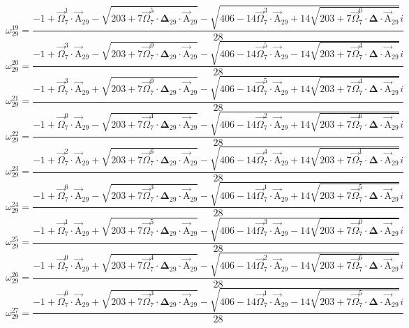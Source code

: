 \documentclass{article}
\begin{document}
\[ \omega_{29}^{19}=\frac{-1+\vec{\Omega}_{7}^{1}\cdot\vec{\mathrm{A}}_{29}-\sqrt{203+7\vec{\Omega}_{7}^{5}\cdot\boldsymbol{\Delta}_{29}\cdot\vec{\mathrm{A}}_{29}}-\sqrt{406-14\vec{\Omega}_{7}^{3}\cdot\vec{\mathrm{A}}_{29}+14\sqrt{203+7\vec{\Omega}_{7}^{0}\cdot\boldsymbol{\Delta}\cdot\vec{\mathrm{A}}_{29}}}i}{28} \]
\[ \omega_{29}^{20}=\frac{-1+\vec{\Omega}_{7}^{3}\cdot\vec{\mathrm{A}}_{29}-\sqrt{203+7\vec{\Omega}_{7}^{0}\cdot\boldsymbol{\Delta}_{29}\cdot\vec{\mathrm{A}}_{29}}-\sqrt{406-14\vec{\Omega}_{7}^{5}\cdot\vec{\mathrm{A}}_{29}-14\sqrt{203+7\vec{\Omega}_{7}^{4}\cdot\boldsymbol{\Delta}\cdot\vec{\mathrm{A}}_{29}}}i}{28} \]
\[ \omega_{29}^{21}=\frac{-1+\vec{\Omega}_{7}^{3}\cdot\vec{\mathrm{A}}_{29}+\sqrt{203+7\vec{\Omega}_{7}^{0}\cdot\boldsymbol{\Delta}_{29}\cdot\vec{\mathrm{A}}_{29}}-\sqrt{406-14\vec{\Omega}_{7}^{5}\cdot\vec{\mathrm{A}}_{29}+14\sqrt{203+7\vec{\Omega}_{7}^{4}\cdot\boldsymbol{\Delta}\cdot\vec{\mathrm{A}}_{29}}}i}{28} \]
\[ \omega_{29}^{22}=\frac{-1+\vec{\Omega}_{7}^{0}\cdot\vec{\mathrm{A}}_{29}-\sqrt{203+7\vec{\Omega}_{7}^{4}\cdot\boldsymbol{\Delta}_{29}\cdot\vec{\mathrm{A}}_{29}}-\sqrt{406-14\vec{\Omega}_{7}^{2}\cdot\vec{\mathrm{A}}_{29}+14\sqrt{203+7\vec{\Omega}_{7}^{6}\cdot\boldsymbol{\Delta}\cdot\vec{\mathrm{A}}_{29}}}i}{28} \]
\[ \omega_{29}^{23}=\frac{-1+\vec{\Omega}_{7}^{2}\cdot\vec{\mathrm{A}}_{29}+\sqrt{203+7\vec{\Omega}_{7}^{6}\cdot\boldsymbol{\Delta}_{29}\cdot\vec{\mathrm{A}}_{29}}-\sqrt{406-14\vec{\Omega}_{7}^{4}\cdot\vec{\mathrm{A}}_{29}+14\sqrt{203+7\vec{\Omega}_{7}^{1}\cdot\boldsymbol{\Delta}\cdot\vec{\mathrm{A}}_{29}}}i}{28} \]
\[ \omega_{29}^{24}=\frac{-1+\vec{\Omega}_{7}^{6}\cdot\vec{\mathrm{A}}_{29}-\sqrt{203+7\vec{\Omega}_{7}^{3}\cdot\boldsymbol{\Delta}_{29}\cdot\vec{\mathrm{A}}_{29}}-\sqrt{406-14\vec{\Omega}_{7}^{1}\cdot\vec{\mathrm{A}}_{29}+14\sqrt{203+7\vec{\Omega}_{7}^{5}\cdot\boldsymbol{\Delta}\cdot\vec{\mathrm{A}}_{29}}}i}{28} \]
\[ \omega_{29}^{25}=\frac{-1+\vec{\Omega}_{7}^{1}\cdot\vec{\mathrm{A}}_{29}+\sqrt{203+7\vec{\Omega}_{7}^{5}\cdot\boldsymbol{\Delta}_{29}\cdot\vec{\mathrm{A}}_{29}}-\sqrt{406-14\vec{\Omega}_{7}^{3}\cdot\vec{\mathrm{A}}_{29}-14\sqrt{203+7\vec{\Omega}_{7}^{0}\cdot\boldsymbol{\Delta}\cdot\vec{\mathrm{A}}_{29}}}i}{28} \]
\[ \omega_{29}^{26}=\frac{-1+\vec{\Omega}_{7}^{0}\cdot\vec{\mathrm{A}}_{29}+\sqrt{203+7\vec{\Omega}_{7}^{4}\cdot\boldsymbol{\Delta}_{29}\cdot\vec{\mathrm{A}}_{29}}-\sqrt{406-14\vec{\Omega}_{7}^{2}\cdot\vec{\mathrm{A}}_{29}-14\sqrt{203+7\vec{\Omega}_{7}^{6}\cdot\boldsymbol{\Delta}\cdot\vec{\mathrm{A}}_{29}}}i}{28} \]
\[ \omega_{29}^{27}=\frac{-1+\vec{\Omega}_{7}^{6}\cdot\vec{\mathrm{A}}_{29}+\sqrt{203+7\vec{\Omega}_{7}^{3}\cdot\boldsymbol{\Delta}_{29}\cdot\vec{\mathrm{A}}_{29}}-\sqrt{406-14\vec{\Omega}_{7}^{1}\cdot\vec{\mathrm{A}}_{29}-14\sqrt{203+7\vec{\Omega}_{7}^{5}\cdot\boldsymbol{\Delta}\cdot\vec{\mathrm{A}}_{29}}}i}{28} \]
\end{document}

